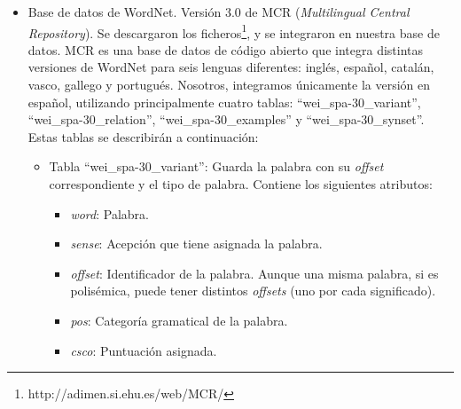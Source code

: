 \begin{itemize}
	\item Base de datos de WordNet. Versión 3.0 de MCR (\textit{Multilingual Central Repository}). Se descargaron los ficheros\footnote{http://adimen.si.ehu.es/web/MCR/}, y se integraron en nuestra base de datos.  MCR es una base de datos de código abierto que integra distintas versiones de WordNet para seis lenguas diferentes: inglés, español, catalán, vasco, gallego y portugués. Nosotros, integramos únicamente la versión en español,  
	utilizando principalmente cuatro tablas: ``wei\_spa-30\_variant'', ``wei\_spa-30\_relation'', ``wei\_spa-30\_examples'' y ``wei\_spa-30\_synset''. Estas tablas se describirán a continuación:
	\begin{itemize}
		\item Tabla ``wei\_spa-30\_variant'': Guarda la palabra con su \textit{offset} correspondiente y el tipo de palabra. Contiene los siguientes atributos:
		\begin{itemize}
			\item \textit{word}: Palabra.
			\item \textit{sense}: Acepción que tiene asignada la palabra.
			\item \textit{offset}: Identificador de la palabra. Aunque una misma palabra, si es polisémica, puede tener distintos \textit{offsets} (uno por cada significado).
			\item \textit{pos}: Categoría gramatical de la palabra.
			\item \textit{csco}: Puntuación asignada.
			

\end{itemize}
\end{itemize}
\end{itemize}
